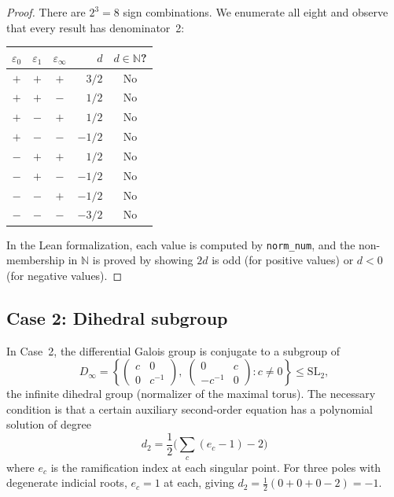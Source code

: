 \documentclass[11pt]{article}
\theoremstyle{plain}
\theoremstyle{definition}
\theoremstyle{remark}
\newcommand{\N}{\mathbb{N}}
\newcommand{\SL}{\mathrm{SL}}
\begin{document}
\begin{proof}
There are $2^3 = 8$ sign combinations.
We enumerate all eight and observe that every result has denominator~2:

\smallskip
\begin{center}
\renewcommand{\arraystretch}{1.05}
\begin{tabular}{@{}ccc|r|c@{}}
\toprule
$\varepsilon_0$ & $\varepsilon_1$ & $\varepsilon_\infty$ & $d$ & $d \in \N$? \\
\midrule
$+$ & $+$ & $+$ & $3/2$ & No \\
$+$ & $+$ & $-$ & $1/2$ & No \\
$+$ & $-$ & $+$ & $1/2$ & No \\
$+$ & $-$ & $-$ & $-1/2$ & No \\
$-$ & $+$ & $+$ & $1/2$ & No \\
$-$ & $+$ & $-$ & $-1/2$ & No \\
$-$ & $-$ & $+$ & $-1/2$ & No \\
$-$ & $-$ & $-$ & $-3/2$ & No \\
\bottomrule
\end{tabular}
\end{center}
\smallskip

\noindent
In the Lean formalization, each value is computed by \texttt{norm\_num}, and the non-membership in $\N$ is proved by showing $2d$ is odd (for positive values) or $d < 0$ (for negative values).
\end{proof}

\subsection{Case 2: Dihedral subgroup}

In Case~2, the differential Galois group is conjugate to a subgroup of
\[
  D_\infty = \left\{ \begin{pmatrix} c & 0 \\ 0 & c^{-1} \end{pmatrix},\; \begin{pmatrix} 0 & c \\ -c^{-1} & 0 \end{pmatrix} : c \neq 0 \right\} \leq \SL_2,
\]
the infinite dihedral group (normalizer of the maximal torus).
The necessary condition is that a certain auxiliary second-order equation has a polynomial solution of degree
\[
  d_2 = \frac{1}{2}\bigl(\sum_{c} (e_c - 1) - 2\bigr)
\]
where $e_c$ is the ramification index at each singular point.
For three poles with degenerate indicial roots, $e_c = 1$ at each, giving $d_2 = \frac{1}{2}(0 + 0 + 0 - 2) = -1$.
\end{document}
